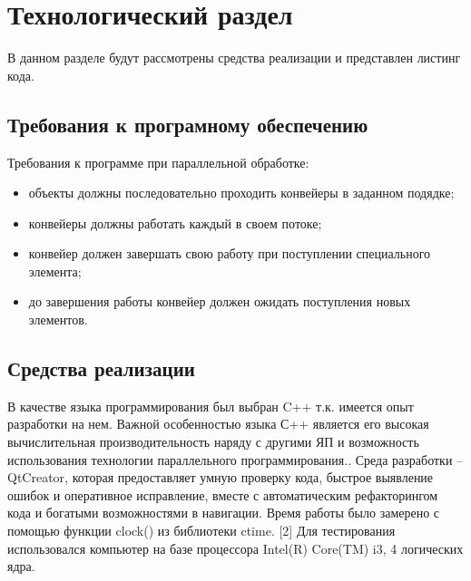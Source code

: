\chapter{Технологический раздел}
В данном разделе будут рассмотрены средства реализации и представлен листинг кода.

\section{Требования к програмному обеспечению}
Требования к программе при параллельной обработке:
\begin{itemize}
	\item объекты должны последовательно проходить конвейеры в заданном подядке;
	\item конвейеры должны работать каждый в своем потоке;
	\item конвейер должен завершать свою работу при поступлении специального элемента;
	\item до завершения работы конвейер должен ожидать поступления новых элементов.
\end{itemize}

\section{Средства реализации}
В качестве языка программирования был выбран C++ т.к. имеется опыт разработки на нем. Важной особенностью языка С++ является его высокая вычислительная производительность наряду с другими ЯП и возможность использования технологии параллельного программирования.\cite{c++}.
Среда разработки – QtCreator, которая предоставляет умную проверку кода, быстрое выявление ошибок и оперативное исправление, вместе с автоматическим рефакторингом кода и богатыми возможностями в навигации\cite{qt}.
Время работы было замерено с помощью функции clock() из библиотеки ctime. [2]
Для тестирования использовался компьютер на базе процессора Intel(R) Core(TM) i3, 4 логических ядра.

